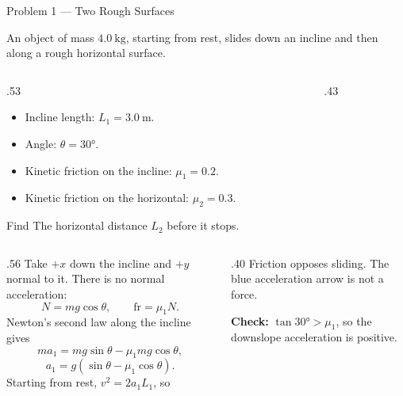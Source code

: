 \begin{frame}{Problem 1 — Two Rough Surfaces}
  \par
  \small
  An object of mass \(\SI{4.0}{\kilogram}\), starting from rest,
  slides down an incline and then along a rough horizontal surface.
  \medskip
  \begin{columns}[T,onlytextwidth]
    \begin{column}{.53\textwidth}
      \begin{itemize}
        \item Incline length: \(L_1=\SI{3.0}{\metre}\).
        \item Angle: \(\theta=\ang{30}\).
        \item Kinetic friction on the incline: \(\mu_1=0.2\).
        \item Kinetic friction on the horizontal: \(\mu_2=0.3\).
      \end{itemize}
      \begin{block}{Find}
        The horizontal distance \(L_2\) before it stops.
      \end{block}
    \end{column}
    \begin{column}{.43\textwidth}
    \end{column}
  \end{columns}
\end{frame}

\begin{solutionframe}
  \begin{columns}[T,onlytextwidth]
    \begin{column}{.56\textwidth}
      Take \(+x\) down the incline and \(+y\) normal to it.
      There is no normal acceleration:
      \[
        N=mg\cos\theta,\qquad \mathrm{fr}=\mu_1N.
      \]
      Newton's second law along the incline gives
      \[
        ma_1=mg\sin\theta-\mu_1mg\cos\theta,
      \]
      \[
        a_1=g(\sin\theta-\mu_1\cos\theta).
      \]
      Starting from rest, \(v^2=2a_1L_1\), so
    \end{column}
    \begin{column}{.40\textwidth}
      \medskip
      Friction opposes sliding. The blue acceleration arrow is not a force.

      \medskip
      \textbf{Check:} \(\tan\ang{30}>\mu_1\), so the downslope acceleration is positive.
    \end{column}
  \end{columns}
\end{solutionframe}

